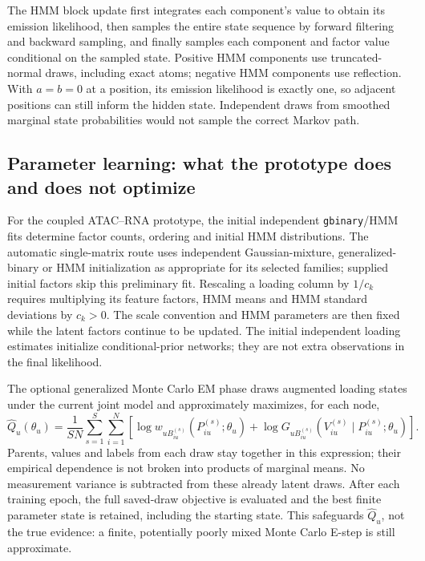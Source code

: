 The HMM block update first integrates each component's value to obtain
its emission likelihood, then samples the entire state sequence by
forward filtering and backward sampling, and finally samples each
component and factor value conditional on the sampled state. Positive
HMM components use truncated-normal draws, including exact atoms;
negative HMM components use reflection. With \(a=b=0\) at a position,
its emission likelihood is exactly one, so adjacent positions can still
inform the hidden state. Independent draws from smoothed marginal state
probabilities would not sample the correct Markov path.

\subsection{Parameter learning: what the prototype does and does not optimize}
For the coupled ATAC--RNA prototype, the initial independent
\texttt{gbinary}/HMM fits determine factor counts, ordering and initial HMM
distributions. The automatic single-matrix route uses independent
Gaussian-mixture, generalized-binary or HMM initialization as appropriate
for its selected families; supplied initial factors skip this preliminary
fit. Rescaling a loading column by
\(1/c_k\) requires multiplying its feature factors, HMM means and HMM
standard deviations by \(c_k>0\). The scale convention and HMM parameters
are then fixed while the latent factors continue to be updated.
The initial independent loading estimates initialize conditional-prior
networks; they are not extra observations in the final likelihood.

The optional generalized Monte Carlo EM phase draws augmented loading
states under the current joint model and approximately maximizes, for
each node,
\begin{equation}
\widehat Q_u(\theta_u)=\frac1{SN}\sum_{s=1}^S\sum_{i=1}^N
\left[
\log w_{uB_{iu}^{(s)}}(P_{iu}^{(s)};\theta_u)
+\log G_{uB_{iu}^{(s)}}(V_{iu}^{(s)}\mid P_{iu}^{(s)};\theta_u)
\right].
\label{eq:implementedmcem}
\end{equation}
Parents, values and labels from each draw stay together in this expression;
their empirical dependence is not broken into products of marginal means.
No measurement variance is subtracted from these already latent draws.
After each training epoch, the full saved-draw objective is evaluated and
the best finite parameter state is retained, including the starting state.
This safeguards \(\widehat Q_u\), not the true evidence: a finite,
potentially poorly mixed Monte Carlo E-step is still approximate.

